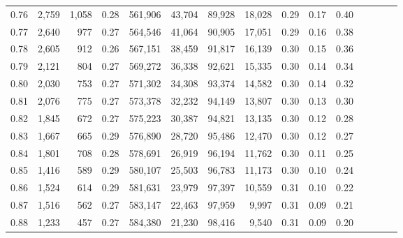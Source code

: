 \begin{tabular}{rrrcrrrrrrrrrrr}
0.76 &   2,759 &  1,058 &                                       0.28 &  561,906 &   43,704 &   89,928 &   18,028 &  0.29 &  0.17 &                         0.40 \\
0.77 &   2,640 &    977 &                                       0.27 &  564,546 &   41,064 &   90,905 &   17,051 &  0.29 &  0.16 &                         0.38 \\
0.78 &   2,605 &    912 &                                       0.26 &  567,151 &   38,459 &   91,817 &   16,139 &  0.30 &  0.15 &                         0.36 \\
0.79 &   2,121 &    804 &                                       0.27 &  569,272 &   36,338 &   92,621 &   15,335 &  0.30 &  0.14 &                         0.34 \\
0.80 &   2,030 &    753 &                                       0.27 &  571,302 &   34,308 &   93,374 &   14,582 &  0.30 &  0.14 &                         0.32 \\
0.81 &   2,076 &    775 &                                       0.27 &  573,378 &   32,232 &   94,149 &   13,807 &  0.30 &  0.13 &                         0.30 \\
0.82 &   1,845 &    672 &                                       0.27 &  575,223 &   30,387 &   94,821 &   13,135 &  0.30 &  0.12 &                         0.28 \\
0.83 &   1,667 &    665 &                                       0.29 &  576,890 &   28,720 &   95,486 &   12,470 &  0.30 &  0.12 &                         0.27 \\
0.84 &   1,801 &    708 &                                       0.28 &  578,691 &   26,919 &   96,194 &   11,762 &  0.30 &  0.11 &                         0.25 \\
0.85 &   1,416 &    589 &                                       0.29 &  580,107 &   25,503 &   96,783 &   11,173 &  0.30 &  0.10 &                         0.24 \\
0.86 &   1,524 &    614 &                                       0.29 &  581,631 &   23,979 &   97,397 &   10,559 &  0.31 &  0.10 &                         0.22 \\
0.87 &   1,516 &    562 &                                       0.27 &  583,147 &   22,463 &   97,959 &    9,997 &  0.31 &  0.09 &                         0.21 \\
0.88 &   1,233 &    457 &                                       0.27 &  584,380 &   21,230 &   98,416 &    9,540 &  0.31 &  0.09 &                         0.20 \\

\end{tabular}
